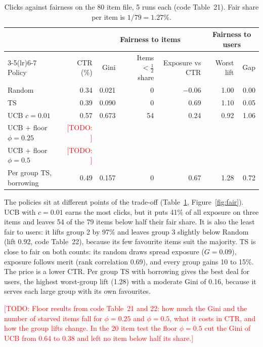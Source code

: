 \documentclass[11pt]{article}
\newcommand{\todo}[1]{\textcolor{red}{[TODO: #1]}}
\begin{document}
\begin{table}[H]
  \centering
  \caption{Clicks against fairness on the 80 item file, 5 runs each
    (code Table~21). Fair share per item is $1/79 = 1.27\%$.}
  \label{tab:e}
  \footnotesize
  \setlength{\tabcolsep}{4pt}
  \begin{tabular}{lrrrrrr}
    \toprule
    & & \multicolumn{3}{c}{Fairness to items} & \multicolumn{2}{c}{Fairness to users} \\
    \cmidrule(lr){3-5}\cmidrule(lr){6-7}
    Policy & CTR (\%) & Gini & Items $<\tfrac12$ share & Exposure vs CTR & Worst lift & Gap \\
    \midrule
    Random                      & 0.34 & 0.021 &  0 & $-0.06$ & 1.00 & 0.00 \\
    TS                          & 0.39 & 0.090 &  0 & 0.69 & 1.10 & 0.05 \\
    UCB $c=0.01$                & 0.57 & 0.673 & 54 & 0.24 & 0.92 & 1.06 \\
    UCB + floor $\phi=0.25$     & \todo{} & & & & & \\
    UCB + floor $\phi=0.5$      & \todo{} & & & & & \\
    Per group TS, borrowing     & 0.49 & 0.157 &  0 & 0.67 & 1.28 & 0.72 \\
    \bottomrule
  \end{tabular}
\end{table}

The policies sit at different points of the trade-off (Table~\ref{tab:e},
Figure~\ref{fig:fair}). UCB with $c=0.01$ earns the most clicks, but it puts
41\% of all exposure on three items and leaves 54 of the 79 items below half
their fair share. It is also the least fair to users: it lifts group 2 by
97\% and leaves group 3 slightly below Random (lift 0.92, code Table~22),
because its few favourite items suit the majority. TS is close to fair on
both counts: its random draws spread exposure ($G=0.09$), exposure follows
merit (rank correlation 0.69), and every group gains 10 to 15\%. The price is
a lower CTR. Per group TS with borrowing gives the best deal for users, the
highest worst-group lift (1.28) with a moderate Gini of 0.16, because it
serves each large group with its own favourites.

\todo{Floor results from code Table~21 and 22: how much the Gini and the number
of starved items fall for $\phi=0.25$ and $\phi=0.5$, what it costs in CTR,
and how the group lifts change. In the 20 item test the floor $\phi=0.5$ cut
the Gini of UCB from 0.64 to 0.38 and left no item below half its share.}
\end{document}
